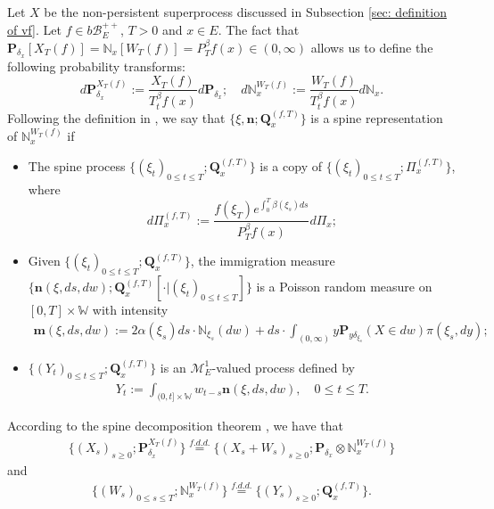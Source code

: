 \documentclass[12pt, a4paper]{amsart}
\theoremstyle{definition}
\numberwithin{equation}{section}
\begin{document}
\subsection{}
	Let $X$ be the non-persistent superprocess discussed in Subsection \ref{sec: definition of vf}.
	Let $f\in b\mathscr B_E^{++}$, $T >0$ and $x\in E$.
	The fact that $\mathbf P_{\delta_x}[X_T(f)] = \mathbb N_x[W_T(f)] = P^\beta_T f(x) \in (0,\infty)$ allows us to define the following probability transforms:
\begin{equation}
	d\mathbf P_{\delta_x}^{X_T(f)}
	:= \frac{X_T(f)}{T_t^\beta f(x)} d\mathbf P_{\delta_x};
	\quad d\mathbb N_x^{W_T(f)}
	:=  \frac{W_T(f)}{T_t^\beta f(x)} d\mathbb N_x.
\end{equation}
	Following the definition in \cite{RenSongSun2017Spine}, we say that $\{\xi, \mathbf n;\mathbf Q_{x}^{(f,T)}\}$ is a spine representation of $\mathbb N_x^{W_T(f)}$ if
\begin{itemize}
\item
    The spine process $\{(\xi_t)_{0\leq t\leq T}; \mathbf Q^{(f,T)}_x\}$ is a copy of $\{(\xi_t)_{0\leq t\leq T}; \Pi^{(f,T)}_{x}\}$, 
    where
\begin{equation}
    d\Pi_x^{(f,T)} := \frac{f(\xi_T)e^{\int_0^T \beta(\xi_s)ds}}{P^\beta_T f(x)} d \Pi_x;
\end{equation}
\item
    Given $\{(\xi_t)_{0\leq t\leq T}; \mathbf Q^{(f,T)}_x\}$, the immigration measure $\{\mathbf n(\xi,ds,dw); \mathbf Q^{(f,T)}_x[\cdot |(\xi_t)_{0\leq t\leq T}]\}$ is a Poisson random measure on $[0,T] \times \mathbb W$ with intensity
\begin{align}
    \mathbf m(\xi,ds,dw)
    := 2 \alpha(\xi_s) ds \cdot \mathbb N_{\xi_s}(dw) + ds \cdot \int_{(0,\infty)} y \mathbf P_{y\delta_{\xi_s}}(X\in dw) \pi(\xi_s,dy);
\end{align}
\item
    $\{(Y_t)_{0\leq t\leq T}; \mathbf Q^{(f,T)}_x\}$ is an $\mathcal M^1_E$-valued process defined by
\begin{align}
    Y_t
    := \int_{(0,t] \times \mathbb W} w_{t-s} \mathbf n(\xi,ds,dw),
    \quad 0 \leq t\leq T.
\end{align}
\end{itemize}
	According to the spine decomposition theorem \cite{RenSongSun2017Spine}, we have that
\begin{align}
\label{eq: Spine decomposition 1}
	\{(X_s)_{s \geq 0};\mathbf P_{\delta_x}^{X_T(f)}\}
	\overset{f.d.d.}{=} \{(X_s + W_s)_{s \geq 0};\mathbf P_{\delta_x} \otimes \mathbb N_x^{W_T(f)} \}
\end{align}
    and
\begin{align}
\label{eq: Spine decomposition 2}
    \{(W_s)_{0\leq s\leq T};\mathbb N_x^{W_T(f)}\}
    \overset{f.d.d.}{=} \{(Y_s)_{s \geq 0};\mathbf Q_x^{(f,T)}\}.
\end{align}
\end{document}
